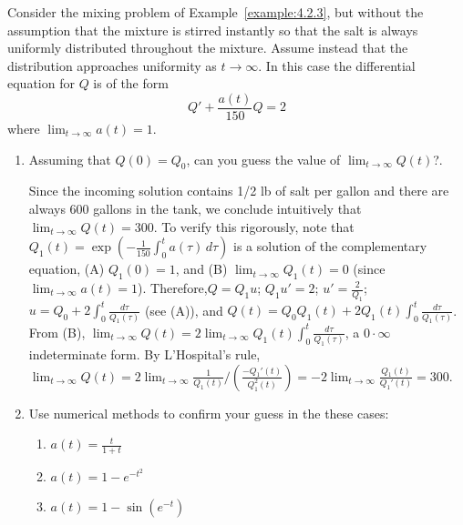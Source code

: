 \documentclass{ximera}
\begin{document}
\begin{problem}\label{exer:4.2.22}  
Consider the mixing problem of Example~\ref{example:4.2.3}, but without
the assumption that the mixture is stirred instantly so that the salt
is always uniformly distributed throughout the mixture. Assume instead
that the distribution approaches uniformity as $t\to\infty$.
In this case the differential equation for $Q$ is  of the form
$$
Q'+\frac{a(t)}{150}Q=2
$$
where  $\lim_{t\to\infty}a(t)=1$.

\begin{enumerate}
\item %
Assuming that
$Q(0)=Q_0$, can you guess the value of
$\lim_{t\to\infty}Q(t)$?.

\begin{solution}
Since the incoming solution contains 1/2 lb of salt per gallon and there are always 600 gallons in the tank, we conclude
intuitively that $\lim_{t\to\infty}Q(t)=300$.
To verify this rigorously,
note that $Q_1(t)=\exp\left(-\frac{1}{150}\int_0^t
a(\tau)\,d\tau\right)$ is a solution of the complementary equation,
(A) $Q_1(0)=1$, and (B) $\lim_{t\to\infty}Q_1(t)=0$ (since
$\lim_{t\to\infty}a(t)=1$).  Therefore,$Q=Q_1u$; $Q_1u'=2$;
$u'=\frac{2}{Q_1}$;
$u=Q_0+2\int_0^t\frac{d\tau}{Q_1(\tau)}$ (see (A)), and
$Q(t)=Q_0Q_1(t)+2Q_1(t)\int_0^t\frac{d\tau}{Q_1(\tau)}$.
From (B),
$\lim_{t\to\infty}Q(t)=2\lim_{t\to\infty}Q_1(t)
\int_0^t\frac{d\tau}{Q_1(\tau)}$, a $0\cdot\infty$ indeterminate
form. By L'Hospital's rule,
$\lim_{t\to\infty}Q(t)=2\lim_{t\to\infty}
\frac{1}{Q_1(t)}\bigg/\left(\frac{-Q_1'(t)}{Q_1^2(t)}\right)
=-2\lim_{t\to\infty}\frac{Q_1(t)}{Q_1'(t)}=300$.
\end{solution}

\item %
Use numerical methods to  confirm  your guess in the these cases:
\begin{enumerate}
    \item $a(t)=\frac{t}{1+t}$
    \item $a(t)=1-e^{-t^2}$
    \item $a(t)=1-\sin(e^{-t})$
\end{enumerate}

\end{enumerate}
\end{problem}
\end{document}
